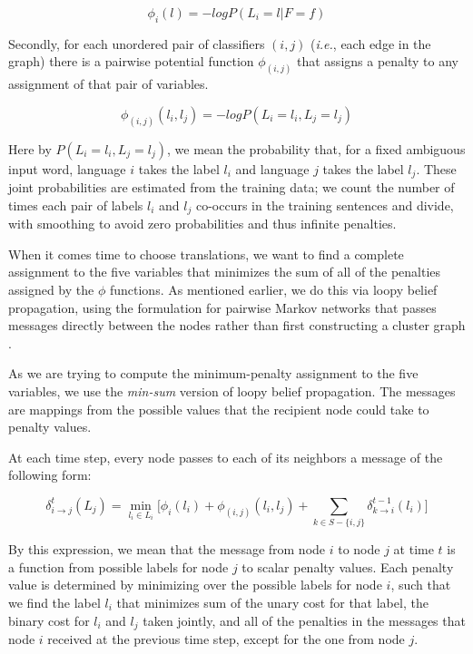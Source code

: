 \documentclass[11pt,letterpaper]{article}
\begin{document}
$$
\phi_i(l) = - log P(L_i = l | F = f)
$$

Secondly, for each unordered pair of classifiers $(i,j)$ (\emph{i.e.}, each
edge in the graph) there is a pairwise potential function $\phi_{(i,j)}$ that
assigns a penalty to any assignment of that pair of variables.

$$
\phi_{(i,j)}(l_i, l_j) = - log P(L_i = l_i, L_j = l_j)
$$

Here by $P(L_i = l_i, L_j = l_j)$, we mean the probability that, for a fixed
ambiguous input word, language $i$ takes the label $l_i$ and language $j$ takes
the label $l_j$. These joint probabilities are estimated from the training
data; we count the number of times each pair of labels $l_i$ and $l_j$
co-occurs in the training sentences and divide, with smoothing to avoid zero
probabilities and thus infinite penalties.

When it comes time to choose translations, we want to find a complete
assignment to the five variables that minimizes the sum of all of the penalties
assigned by the $\phi$ functions. As mentioned earlier, we do this via loopy
belief propagation, using the formulation for pairwise Markov networks that
passes messages directly between the nodes rather than first constructing a
cluster graph \cite[\S 11.3.5.1]{Koller+Friedman:09}.

As we are trying to compute the minimum-penalty assignment to the five
variables, we use the \emph{min-sum} version of loopy belief propagation. The
messages are mappings from the possible values that the recipient node could
take to penalty values.

At each time step, every node passes to each of its neighbors a message of the
following form:

\begin{dmath*}
\delta_{i \rightarrow j}^{t} (L_j) =
  \min_{l_i \in L_i} \Big[
  \phi_i(l_i) +
  \phi_{(i,j)}(l_i, l_j) +
  \sum_{k \in S - \lbrace i,j \rbrace}
  \delta_{k \rightarrow i}^{t-1} (l_i)
  \Big]
\end{dmath*}

By this expression, we mean that the message from node $i$ to node $j$ at time
$t$ is a function from possible labels for node $j$ to scalar penalty values.
Each penalty value is determined by minimizing over the possible labels for
node $i$, such that we find the label $l_i$ that minimizes sum of the unary
cost for that label, the binary cost for $l_i$ and $l_j$ taken jointly, and all
of the penalties in the messages that node $i$ received at the previous time
step, except for the one from node $j$.
\end{document}
